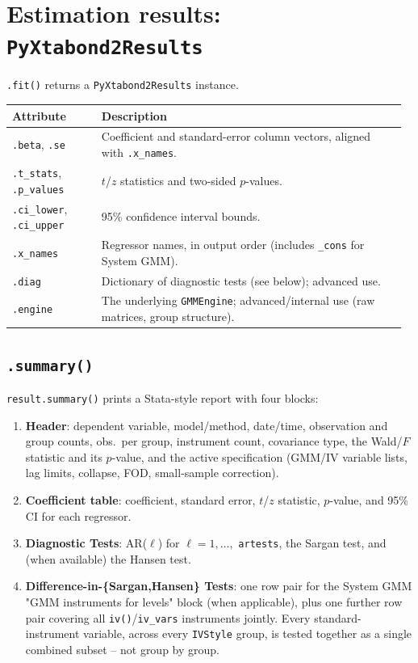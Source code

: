 \documentclass[11pt,a4paper]{article}
\begin{document}
\section{Estimation results: \texttt{PyXtabond2Results}}
\label{sec:results}

\texttt{.fit()} returns a \texttt{PyXtabond2Results} instance.

\begin{longtable}{@{}p{0.22\linewidth}p{0.75\linewidth}@{}}
\toprule
\textbf{Attribute} & \textbf{Description} \\
\midrule
\endhead
\texttt{.beta}, \texttt{.se} & Coefficient and standard-error column vectors,
  aligned with \texttt{.x\_names}. \\
\texttt{.t\_stats}, \texttt{.p\_values} & $t$/$z$ statistics and two-sided
  $p$-values. \\
\texttt{.ci\_lower}, \texttt{.ci\_upper} & 95\% confidence interval bounds. \\
\texttt{.x\_names} & Regressor names, in output order (includes
  \texttt{\_cons} for System GMM). \\
\texttt{.diag} & Dictionary of diagnostic tests (see below); advanced use. \\
\texttt{.engine} & The underlying \texttt{GMMEngine}; advanced/internal use
  (raw matrices, group structure). \\
\bottomrule
\end{longtable}

\subsection{\texttt{.summary()}}

\texttt{result.summary()} prints a Stata-style report with four blocks:

\begin{enumerate}[nosep]
  \item \textbf{Header}: dependent variable, model/method, date/time,
        observation and group counts, obs.\ per group, instrument count,
        covariance type, the Wald/$F$ statistic and its $p$-value, and the
        active specification (GMM/IV variable lists, lag limits, collapse,
        FOD, small-sample correction).
  \item \textbf{Coefficient table}: coefficient, standard error, $t$/$z$
        statistic, $p$-value, and 95\% CI for each regressor.
  \item \textbf{Diagnostic Tests}: AR($\ell$) for $\ell=1,\dots,$
        \texttt{artests}, the Sargan test, and (when available) the Hansen
        test.
  \item \textbf{Difference-in-\{Sargan,Hansen\} Tests}: one row pair for the
        System GMM "GMM instruments for levels" block (when applicable),
        plus one further row pair covering all \texttt{iv()}/\texttt{iv\_vars}
        instruments jointly. Every standard-instrument variable, across every
        \texttt{IVStyle} group, is tested together as a single combined
        subset -- not group by group.
\end{enumerate}
\end{document}
